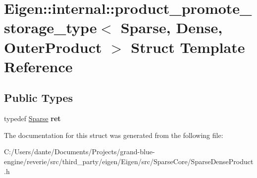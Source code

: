 \hypertarget{struct_eigen_1_1internal_1_1product__promote__storage__type_3_01_sparse_00_01_dense_00_01_outer_product_01_4}{}\section{Eigen\+::internal\+::product\+\_\+promote\+\_\+storage\+\_\+type$<$ Sparse, Dense, Outer\+Product $>$ Struct Template Reference}
\label{struct_eigen_1_1internal_1_1product__promote__storage__type_3_01_sparse_00_01_dense_00_01_outer_product_01_4}
\subsection*{Public Types}
\begin{DoxyCompactItemize}
\item 
\mbox{\label{struct_eigen_1_1internal_1_1product__promote__storage__type_3_01_sparse_00_01_dense_00_01_outer_product_01_4_a6875ca9f7b5e55de729c2c6bc662704c}} 
typedef \mbox{\hyperlink{struct_eigen_1_1_sparse}{Sparse}} {\bfseries ret}
\end{DoxyCompactItemize}


The documentation for this struct was generated from the following file\+:\begin{DoxyCompactItemize}
\item 
C\+:/\+Users/dante/\+Documents/\+Projects/grand-\/blue-\/engine/reverie/src/third\+\_\+party/eigen/\+Eigen/src/\+Sparse\+Core/Sparse\+Dense\+Product.\+h\end{DoxyCompactItemize}
